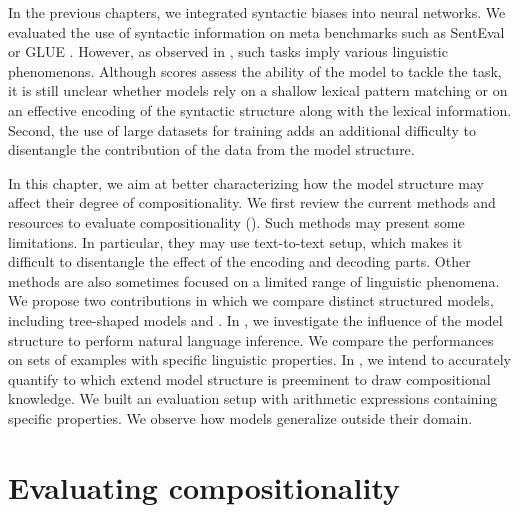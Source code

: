 In the previous chapters, we integrated syntactic biases into neural networks. We evaluated the use of syntactic information on meta benchmarks such as SentEval \parencite{conneau_18} or GLUE \parencite{wang_19}. However, as observed in \textcite{baroni_18}, such tasks imply various linguistic phenomenons. Although scores assess the ability of the model to tackle the task, it is still unclear whether models rely on a shallow lexical pattern matching or on an effective encoding of the syntactic structure along with the lexical information. Second, the use of large datasets for training \parencite{bowman_15, williams_18} adds an additional difficulty to disentangle the contribution of the data from the model structure.

In this chapter, we aim at better characterizing how the model structure may affect their degree of compositionality. We first review the current methods and resources to evaluate compositionality (). Such methods may present some limitations. In particular, they may use text-to-text setup, which makes it difficult to disentangle the effect of the encoding and decoding parts. Other methods are also sometimes focused on a limited range of linguistic phenomena. We  propose two contributions in which we compare distinct structured models, including tree-shaped models and \bert. In , we investigate the influence of the model structure to perform natural language inference. We compare the performances on sets of examples with specific linguistic properties. In , we intend to accurately quantify to which extend model structure is preeminent to draw compositional knowledge. We built an evaluation setup with arithmetic expressions containing specific properties. We observe how models generalize outside their domain.


\section{Evaluating compositionality}

